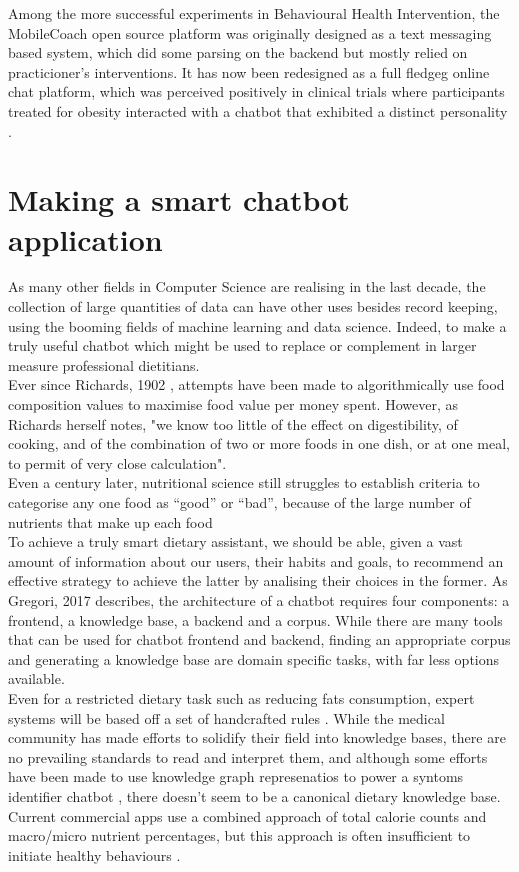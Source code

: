 Among the more successful experiments in Behavioural Health Intervention, the MobileCoach open source platform \cite{mobilecoacheu} was originally designed as a text messaging based system, which did some parsing on the backend but mostly relied on practicioner's interventions. It has now been redesigned as a full fledgeg online chat platform, which was perceived positively in clinical trials where participants treated for obesity interacted with a chatbot that exhibited a distinct personality \cite{Kowatsch2017}. \\
\section{Making a smart chatbot application}
As many other fields in Computer Science are realising in the last decade, the collection of large quantities of data can have other uses besides record keeping, using the booming fields of machine learning and data science. Indeed, to make a truly useful chatbot which might be used to replace or complement in larger measure professional dietitians. \\
Ever since Richards, 1902 \cite{Richards1902a}, attempts have been made to algorithmically use food composition values to maximise food value per money spent. However, as Richards herself notes, "we know too little of the effect on digestibility, of cooking, and of the combination of two or more foods in one dish, or at one meal, to permit of very close calculation". \\
Even a century later, nutritional science still struggles to establish criteria to categorise any one food as ``good'' or ``bad'', because of the large number of nutrients that make up each food \cite{USDAFoodandNutritionService2007} \\
To achieve a truly smart dietary assistant, we should be able, given a vast amount of information about our users, their habits and goals, to recommend an effective strategy to achieve the latter by analising their choices in the former. As Gregori, 2017 \cite{Gregori} describes, the architecture of a chatbot requires four components: a frontend, a knowledge base, a backend and a corpus. While there are many tools that can be used for chatbot frontend and backend, finding an appropriate corpus and generating a knowledge base are domain specific tasks, with far less options available. \\
Even for a restricted dietary task such as reducing fats consumption, expert systems will be based off a set of handcrafted rules \cite{Prochaska2005}. While the medical community has made efforts to solidify their field into knowledge bases, there are no prevailing standards to read and interpret them, and although some efforts have been made to use knowledge graph represenatios to power a syntoms identifier chatbot \cite{minutoloa2017conversational}, there doesn't seem to be a canonical dietary knowledge base. Current commercial apps use a combined approach of total calorie counts and macro/micro nutrient percentages, but this approach is often insufficient to initiate healthy behaviours \cite{Davis2016}.
